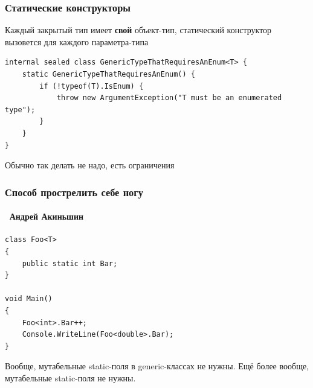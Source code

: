 \documentclass[xetex,mathserif,serif]{beamer}
\begin{document}
    \begin{frame}[fragile]
        \frametitle{Статические конструкторы}
        Каждый закрытый тип имеет \textbf{свой} объект-тип, статический конструктор вызовется для каждого параметра-типа
        \vspace{0.8cm}
        \begin{footnotesize}
            \begin{verbatim}
internal sealed class GenericTypeThatRequiresAnEnum<T> {
    static GenericTypeThatRequiresAnEnum() {
        if (!typeof(T).IsEnum) {
            throw new ArgumentException("T must be an enumerated type");
        }
    }
}
            \end{verbatim}
        \end{footnotesize}
        \vspace{0.8cm}
        Обычно так делать не надо, есть ограничения
    \end{frame}

    \begin{frame}[fragile]
        \frametitle{Способ прострелить себе ногу}
        \framesubtitle{\textcopyright\, Андрей Акиньшин}
        \begin{small}
            \begin{verbatim}
class Foo<T>
{
    public static int Bar;
}

void Main()
{
    Foo<int>.Bar++;
    Console.WriteLine(Foo<double>.Bar);
}
            \end{verbatim}
        \end{small}
        Вообще, мутабельные static-поля в generic-классах не нужны. Ещё более вообще, мутабельные static-поля не нужны.
    \end{frame}
\end{document}
